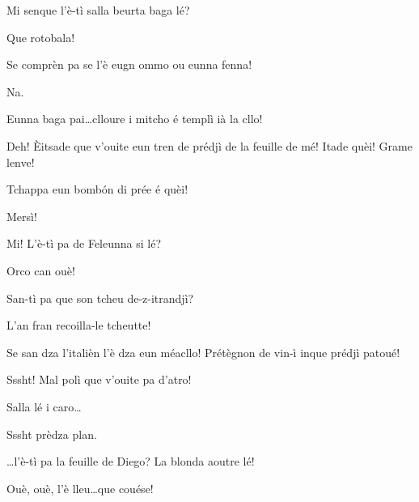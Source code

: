 \begin{drama}
\Vetchotspeaks{} Mi senque l'è-tì salla beurta baga lé?


\Spectateurspeaks Que rotobala!

\Vetchotspeaks Se comprèn pa se l'è eugn ommo ou eunna fenna!

\Spectateurspeaks Na.

\Vetchotspeaks Eunna baga pai\ldots clloure i mitcho é templì ià la cllo!

\Mammaspeaks{} Deh! \`Eitsade que v'ouite eun tren de prédjì de la feuille de mé! Itade quèi! Grame lenve!


\Spectateurspeaks{} Tchappa eun bombón di prée é quèi!

\TsachaouIIspeaks Mersì!



\Vetchotspeaks{} Mi!  L'è-tì pa de Feleunna si lé?

\Spectateurspeaks{} Orco can ouè!

\Vetchotspeaks{} San-tì pa que son tcheu de-z-itrandjì?

\Spectateurspeaks L'an fran recoilla-le tcheutte!

\Vetchotspeaks Se san dza l'italièn l'è dza eun méacllo! Prétègnon de vin-ì inque prédjì patoué!

\TsachaouIIspeaks Sssht! Mal polì que v'ouite pa d'atro!


\TsachaouIIspeaks {} Salla lé i caro\ldots

\TsachaouIspeaks Sssht prèdza plan.

\TsachaouIIspeaks \ldots l'è-tì pa la feuille de Diego? La blonda aoutre lé!

\TsachaouIspeaks Ouè, ouè, l'è lleu\ldots que couése!\ok


\end{drama}
